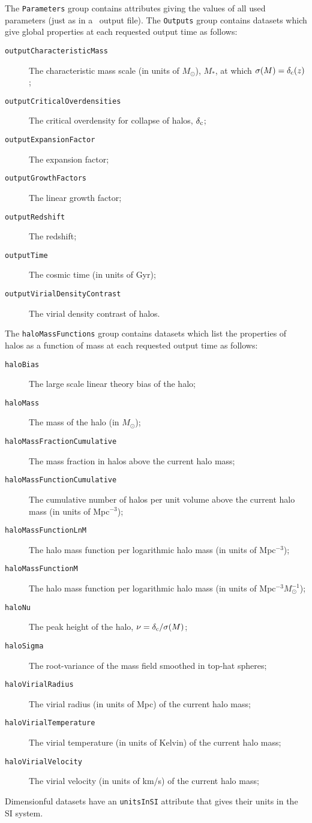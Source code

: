 The {\tt Parameters} group contains attributes giving the values of all used parameters (just as in a \glc\ output file). The {\tt Outputs} group contains datasets which give global properties at each requested output time as follows:
\begin{description}
\item [{\tt outputCharacteristicMass}] The characteristic mass scale (in units of $M_\odot$), $M_*$, at which $\sigma(M)=\delta_{\rm c}(z)$;
\item [{\tt outputCriticalOverdensities}] The critical overdensity for collapse of halos, $\delta_{\rm c}$;
\item [{\tt outputExpansionFactor}] The expansion factor;
\item [{\tt outputGrowthFactors}] The linear growth factor;
\item [{\tt outputRedshift}] The redshift;
\item [{\tt outputTime}] The cosmic time (in units of Gyr);
\item [{\tt outputVirialDensityContrast}] The virial density contrast of halos.
\end{description}
The {\tt haloMassFunctions} group contains datasets which list the properties of halos as a function of mass at each requested output time as follows:
\begin{description}
\item [{\tt haloBias}] The large scale linear theory bias of the halo;
\item [{\tt haloMass}] The mass of the halo (in $M_\odot$);
\item [{\tt haloMassFractionCumulative}] The mass fraction in halos above the current halo mass;
\item [{\tt haloMassFunctionCumulative}] The cumulative number of halos per unit volume above the current halo mass (in units of Mpc$^{-3}$);
\item [{\tt haloMassFunctionLnM}] The halo mass function per logarithmic halo mass (in units of Mpc$^{-3}$);
\item [{\tt haloMassFunctionM}] The halo mass function per logarithmic halo mass (in units of Mpc$^{-3} M_\odot^{-1}$);
\item [{\tt haloNu}] The peak height of the halo, $\nu = \delta_{\rm c}/\sigma(M)$;
\item [{\tt haloSigma}] The root-variance of the mass field smoothed in top-hat spheres;
\item [{\tt haloVirialRadius}] The virial radius (in units of Mpc) of the current halo mass;
\item [{\tt haloVirialTemperature}] The virial temperature (in units of Kelvin) of the current halo mass;
\item [{\tt haloVirialVelocity}] The virial velocity (in units of km/s) of the current halo mass;
\end{description}
Dimensionful datasets have an {\tt unitsInSI} attribute that gives their units in the SI system.

